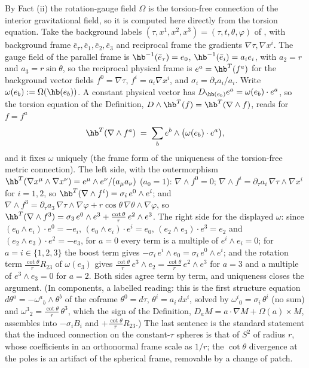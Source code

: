 By Fact (ii) the rotation-gauge field $\Omega$ is the torsion-free connection of the interior gravitational field, so it is computed here directly from the torsion equation. Take the background labels $(\tau, x^1, x^2, x^3) = (\tau, t, \theta, \varphi)$ of , with background frame $\bar e_\tau, \bar e_1, \bar e_2, \bar e_3$ and reciprocal frame the gradients $\nabla\tau, \nabla x^i$. The gauge field of the parallel frame is $\hb^{-1}(\bar e_\tau) = e_0$, $\hb^{-1}(\bar e_i) = a_i e_i$, with $a_2 = r$ and $a_3 = r\sin\theta$, so the reciprocal physical frame is $e^a = \hb^{T}(f^a)$ for the background vector fields $f^0 = \nabla\tau$, $f^i = a_i\nabla x^i$, and $\sigma_i = \partial_\tau a_i/a_i$. Write $\omega(e_b) := \Omega(\hb(e_b))$. A constant physical vector has $D_{\hb(e_b)}e^a = \omega(e_b)\cdot e^a$, so the torsion equation of the Definition, $D\wedge\hb^{T}(f) = \hb^{T}(\nabla\wedge f)$, reads for $f = f^a$
\[
\hb^{T}(\nabla\wedge f^a) \;=\; \sum_b e^b\wedge\bigl(\omega(e_b)\cdot e^a\bigr),
\]
and it fixes $\omega$ uniquely (the frame form of the uniqueness of the torsion-free metric connection). The left side, with the outermorphism $\hb^{T}(\nabla x^\mu\wedge\nabla x^\nu) = e^\mu\wedge e^\nu/(a_\mu a_\nu)$ ($a_0 = 1$): $\nabla\wedge f^0 = 0$; $\nabla\wedge f^i = \partial_\tau a_i\,\nabla\tau\wedge\nabla x^i$ for $i = 1, 2$, so $\hb^{T}(\nabla\wedge f^i) = \sigma_i\,e^0\wedge e^i$; and $\nabla\wedge f^3 = \partial_\tau a_3\,\nabla\tau\wedge\nabla\varphi + r\cos\theta\,\nabla\theta\wedge\nabla\varphi$, so $\hb^{T}(\nabla\wedge f^3) = \sigma_3\,e^0\wedge e^3 + \frac{\cot\theta}{r}\,e^2\wedge e^3$. The right side for the displayed $\omega$: since $(e_0\wedge e_i)\cdot e^0 = -e_i$, $(e_0\wedge e_i)\cdot e^i = e_0$, $(e_2\wedge e_3)\cdot e^3 = e_2$ and $(e_2\wedge e_3)\cdot e^2 = -e_3$, for $a = 0$ every term is a multiple of $e^i\wedge e_i = 0$; for $a = i \in \{1, 2, 3\}$ the boost term gives $-\sigma_i\,e^i\wedge e_0 = \sigma_i\,e^0\wedge e^i$; and the rotation term $\frac{\cot\theta}{r}R_{23}$ of $\omega(e_3)$ gives $\frac{\cot\theta}{r}\,e^3\wedge e_2 = \frac{\cot\theta}{r}\,e^2\wedge e^3$ for $a = 3$ and a multiple of $e^3\wedge e_3 = 0$ for $a = 2$. Both sides agree term by term, and uniqueness closes the argument. (In components, a labelled reading: this is the first structure equation $d\theta^a = -\omega^a{}_b\wedge\theta^b$ of the coframe $\theta^0 = d\tau$, $\theta^i = a_i\,dx^i$, solved by $\omega^i{}_0 = \sigma_i\,\theta^i$ (no sum) and $\omega^3{}_2 = \frac{\cot\theta}{r}\,\theta^3$, which the sign of the Definition, $D_a M = a \cdot \nabla M + \Omega(a) \times M$, assembles into $-\sigma_i B_i$ and $+\frac{\cot\theta}{r}R_{23}$.) The last sentence is the standard statement that the induced connection on the constant-$\tau$ spheres is that of $S^2$ of radius $r$, whose coefficients in an orthonormal frame scale as $1/r$; the $\cot\theta$ divergence at the poles is an artifact of the spherical frame, removable by a change of patch.
